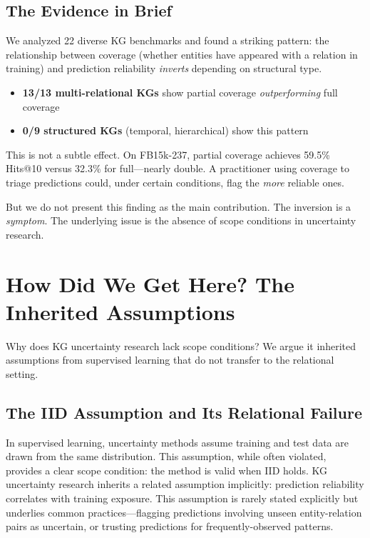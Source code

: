 \documentclass{article}
\begin{document}
\subsection{The Evidence in Brief}

We analyzed 22 diverse KG benchmarks and found a striking pattern: the relationship between coverage (whether entities have appeared with a relation in training) and prediction reliability \emph{inverts} depending on structural type.

\begin{itemize}
    \item \textbf{13/13 multi-relational KGs} show partial coverage \emph{outperforming} full coverage
    \item \textbf{0/9 structured KGs} (temporal, hierarchical) show this pattern
\end{itemize}

This is not a subtle effect. On FB15k-237, partial coverage achieves 59.5\% Hits@10 versus 32.3\% for full---nearly double. A practitioner using coverage to triage predictions could, under certain conditions, flag the \emph{more} reliable ones.

But we do not present this finding as the main contribution. The inversion is a \emph{symptom}. The underlying issue is the absence of scope conditions in uncertainty research.

\section{How Did We Get Here? The Inherited Assumptions}

Why does KG uncertainty research lack scope conditions? We argue it inherited assumptions from supervised learning that do not transfer to the relational setting.

\subsection{The IID Assumption and Its Relational Failure}

In supervised learning, uncertainty methods assume training and test data are drawn from the same distribution. This assumption, while often violated, provides a clear scope condition: the method is valid when IID holds. KG uncertainty research inherits a related assumption implicitly: prediction reliability correlates with training exposure. This assumption is rarely stated explicitly but underlies common practices---flagging predictions involving unseen entity-relation pairs as uncertain, or trusting predictions for frequently-observed patterns.
\end{document}
